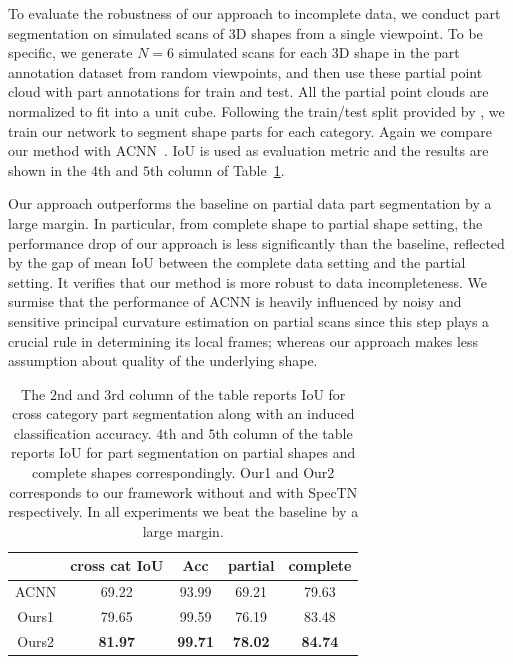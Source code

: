 To evaluate the robustness of our approach to incomplete data, we conduct part segmentation on simulated scans of 3D shapes from a single viewpoint. To be specific, we generate $N=6$ simulated scans for each 3D shape in the part annotation dataset \cite{Yi16} from random viewpoints, and then use these partial point cloud with part annotations for train and test. All the partial point clouds are normalized to fit into a unit cube. Following the train/test split provided by \cite{shapenet2015}, we train our network to segment shape parts for each category. Again we compare our method with ACNN~\cite{boscaini2016learning}. IoU is used as evaluation metric and the results are shown in the $4$th and $5$th column of Table~\ref{tab:partialseg}.

Our approach outperforms the baseline on partial data part segmentation by a large margin. In particular, from complete shape to partial shape setting, the performance drop of our approach is less significantly than the baseline, reflected by the gap of mean IoU between the complete data setting and the partial setting. It verifies that our method is more robust to data incompleteness. We surmise that the performance of ACNN is heavily influenced by noisy and sensitive principal curvature estimation on partial scans since this step plays a crucial rule in determining its local frames; whereas our approach makes less assumption about quality of the underlying shape.

\begin{table}[t!]
\centering
\small
\begin{tabular}{@{}c|cc|cc}
\hline
& cross cat IoU & Acc & partial & complete\\ \hline
ACNN & 69.22 & 93.99 & 69.21 & 79.63 \\ \hline
Ours1 & 79.65 & 99.59 & 76.19 & 83.48 \\
Ours2 & \textbf{81.97} & \textbf{99.71} & \textbf{78.02} & \textbf{84.74} \\ \hline
\end{tabular}
\caption{The $2$nd and $3$rd column of the table reports IoU for cross category part segmentation along with an induced classification accuracy. $4$th and $5$th column of the table reports IoU for part segmentation on partial shapes and complete shapes correspondingly. Our1 and Our2 corresponds to our framework without and with SpecTN respectively. In all experiments we beat the baseline by a large margin.}
\label{tab:partialseg}
\vspace{-0.6cm}
\end{table}

